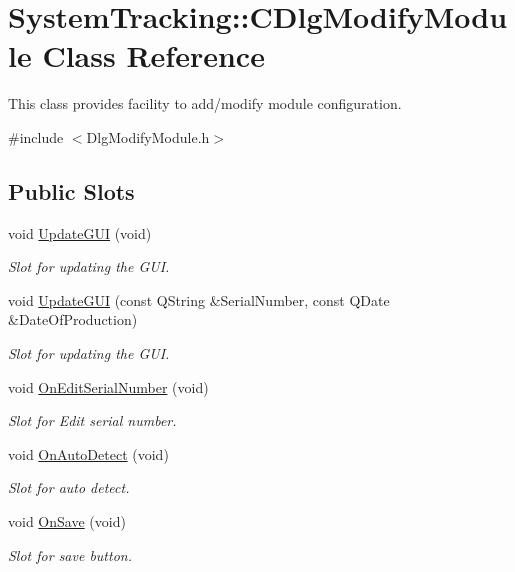 \hypertarget{classSystemTracking_1_1CDlgModifyModule}{\section{\-System\-Tracking\-:\-:\-C\-Dlg\-Modify\-Module \-Class \-Reference}
\label{classSystemTracking_1_1CDlgModifyModule}
}


\-This class provides facility to add/modify module configuration.  




{\ttfamily \#include $<$\-Dlg\-Modify\-Module.\-h$>$}

\subsection*{\-Public \-Slots}
\begin{DoxyCompactItemize}
\item 
void \hyperlink{classSystemTracking_1_1CDlgModifyModule_a1eeaeb07d2892f6dbb54da0fe6e4cc6b}{\-Update\-G\-U\-I} (void)
\begin{DoxyCompactList}\small\item\em \-Slot for updating the \-G\-U\-I. \end{DoxyCompactList}\item 
void \hyperlink{classSystemTracking_1_1CDlgModifyModule_aa1f43b7bc541c0ab76d313d6d383e2de}{\-Update\-G\-U\-I} (const \-Q\-String \&\-Serial\-Number, const \-Q\-Date \&\-Date\-Of\-Production)
\begin{DoxyCompactList}\small\item\em \-Slot for updating the \-G\-U\-I. \end{DoxyCompactList}\item 
void \hyperlink{classSystemTracking_1_1CDlgModifyModule_acb7525d47698d32fa087bd511ec6d9bf}{\-On\-Edit\-Serial\-Number} (void)
\begin{DoxyCompactList}\small\item\em \-Slot for \-Edit serial number. \end{DoxyCompactList}\item 
void \hyperlink{classSystemTracking_1_1CDlgModifyModule_ac30b36eacd52d454ecf0409d27b11525}{\-On\-Auto\-Detect} (void)
\begin{DoxyCompactList}\small\item\em \-Slot for auto detect. \end{DoxyCompactList}\item 
void \hyperlink{classSystemTracking_1_1CDlgModifyModule_a40d5f80148402248ac92f0da646ed3ca}{\-On\-Save} (void)
\begin{DoxyCompactList}\small\item\em \-Slot for save button. \end{DoxyCompactList}\end{DoxyCompactItemize}
